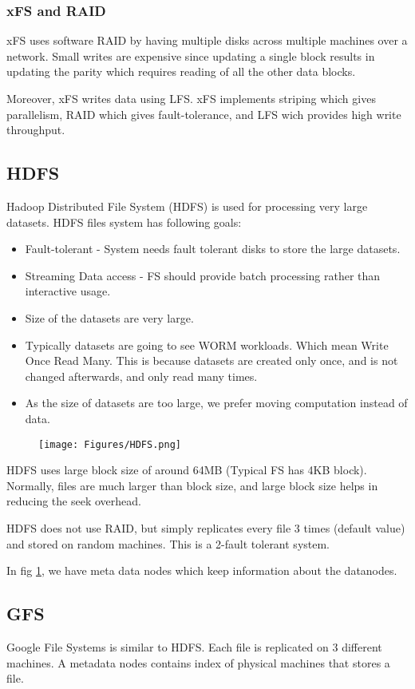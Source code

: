 \documentclass[twoside]{article}
\begin{document}
\subsubsection{xFS and RAID}
xFS uses software RAID by having multiple disks across multiple machines over a network. Small writes are expensive since updating a single block results in updating the parity which requires reading of all the other data blocks.

Moreover, xFS writes data using LFS. xFS implements striping which gives parallelism, RAID which gives fault-tolerance, and LFS wich provides high write throughput.


\subsection{HDFS}
Hadoop Distributed File System (HDFS) is used for processing very large datasets. 
HDFS files system has following goals:
\begin{itemize}
\item Fault-tolerant -  System needs fault tolerant disks to store the large datasets.
\item Streaming Data access - FS should provide batch processing rather than interactive usage.
\item Size of the datasets are very large.
\item Typically datasets are going to see WORM workloads. Which mean Write Once Read Many. This is because datasets are created only once, and is not changed afterwards, and only read many times.
\item As the size of datasets are too large, we prefer moving computation instead of data.
\end{itemize}

\begin{figure}[htbp]
\centering
\texttt{[image: Figures/HDFS.png]}
\label{fig:HDFS}
\end{figure}

HDFS uses large block size of around 64MB (Typical FS has 4KB block). Normally, files are much larger than block size, and large block size helps in reducing the seek overhead.

HDFS does not use RAID, but simply replicates every file 3 times (default value) and stored on random machines. This is a 2-fault tolerant system.

In fig \ref{fig:HDFS}, we have meta data nodes which keep information about the datanodes. 

\subsection{GFS}
Google File Systems is similar to HDFS. Each file is replicated on 3 different machines. A metadata nodes contains index of physical machines that stores a file. 
\end{document}
